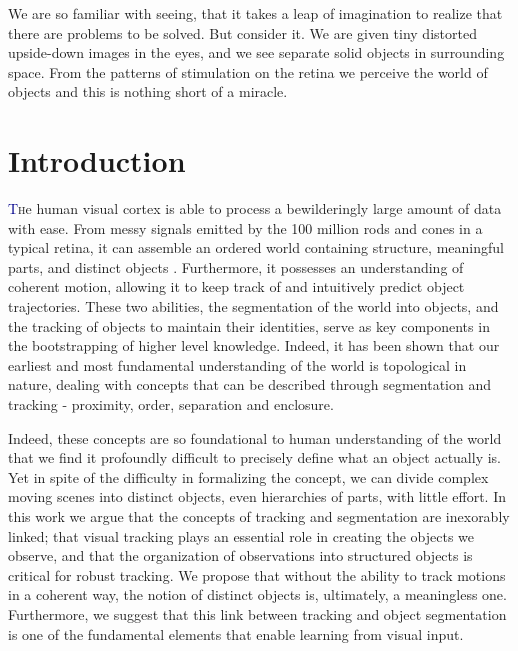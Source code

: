 \begin{savequote}[75mm]
We are so familiar with seeing, that it takes a leap of imagination to realize that there are problems to be solved. But consider it. We are given tiny distorted upside-down images in the eyes, and we see separate solid objects in surrounding space. From the patterns of stimulation on the retina we perceive the world of objects and this is nothing short of a miracle.
\end{savequote}



\chapter{Introduction}
\lettrine[lines=3, loversize=0.3]{\textcolor{DarkBlue}T}he human visual cortex is able to process a bewilderingly large amount of data with ease. From messy signals emitted by the 100 million rods and cones in a typical retina, it can assemble an ordered world containing structure, meaningful parts, and distinct objects \cite{kandel2000principles}. Furthermore, it possesses an understanding of coherent motion, allowing it to keep track of and intuitively predict object trajectories. These two abilities, the segmentation of the world into objects, and the tracking of objects to maintain their identities, serve as key components in the bootstrapping of higher level knowledge. Indeed, it has been shown that our earliest and most fundamental understanding of the world is topological in nature, dealing with concepts that can be described through segmentation and tracking - proximity, order, separation and enclosure\cite{piaget1967}.

Indeed, these concepts are so foundational to human understanding of the world that we find it profoundly difficult to precisely define what an object actually is. Yet in spite of the difficulty in formalizing the concept, we can divide complex moving scenes into distinct objects, even hierarchies of parts, with little effort. In this work we argue that the concepts of tracking and segmentation are inexorably linked; that visual tracking plays an essential role in creating the objects we observe, and that the organization of observations into structured objects is critical for robust tracking. We propose that without the ability to track motions in a coherent way, the notion of distinct objects is, ultimately, a meaningless one. Furthermore, we suggest that this link between tracking and object segmentation is one of the fundamental elements that enable learning from visual input.

